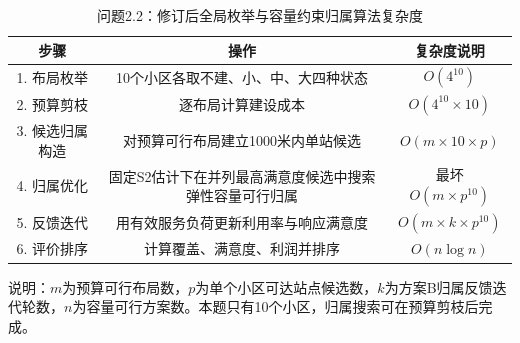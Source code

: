 \begin{table}[htbp]
\centering
\caption{问题2.2：修订后全局枚举与容量约束归属算法复杂度}
\begin{tabular}{|c|c|c|}
\hline
步骤 & 操作 & 复杂度说明 \\
\hline
1. 布局枚举 & 10个小区各取不建、小、中、大四种状态 & $O(4^{10})$ \\
2. 预算剪枝 & 逐布局计算建设成本 & $O(4^{10}\times 10)$ \\
3. 候选归属构造 & 对预算可行布局建立1000米内单站候选 & $O(m\times 10\times p)$ \\
4. 归属优化 & 固定S2估计下在并列最高满意度候选中搜索弹性容量可行归属 & 最坏 $O(m\times p^{10})$ \\
5. 反馈迭代 & 用有效服务负荷更新利用率与响应满意度 & $O(m\times k\times p^{10})$ \\
6. 评价排序 & 计算覆盖、满意度、利润并排序 & $O(n\log n)$ \\
\hline
\end{tabular}

\vspace{0.2cm}
说明：$m$为预算可行布局数，$p$为单个小区可达站点候选数，$k$为方案B归属反馈迭代轮数，$n$为容量可行方案数。本题只有10个小区，归属搜索可在预算剪枝后完成。
\end{table}
